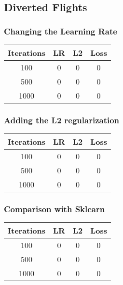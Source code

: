 \documentclass[
	letterpaper, %
	10pt, %
]{class}
\begin{document}
\subsection{Diverted Flights}

\subsubsection{Changing the Learning Rate}

\begin{center}
	\begin{tabular}{ |c|c|c|c| }
		\hline
		Iterations & LR & L2 & Loss \\
		\hline
		100        & 0  & 0  & 0    \\
		500        & 0  & 0  & 0    \\
		1000       & 0  & 0  & 0    \\
		\hline
	\end{tabular}
\end{center}

\subsubsection{Adding the L2 regularization}

\begin{center}
	\begin{tabular}{ |c|c|c|c| }
		\hline
		Iterations & LR & L2 & Loss \\
		\hline
		100        & 0  & 0  & 0    \\
		500        & 0  & 0  & 0    \\
		1000       & 0  & 0  & 0    \\
		\hline
	\end{tabular}
\end{center}

\subsubsection{Comparison with Sklearn}

\begin{center}
	\begin{tabular}{ |c|c|c|c| }
		\hline
		Iterations & LR & L2 & Loss \\
		\hline
		100        & 0  & 0  & 0    \\
		500        & 0  & 0  & 0    \\
		1000       & 0  & 0  & 0    \\
		\hline
	\end{tabular}
\end{center}
\end{document}
